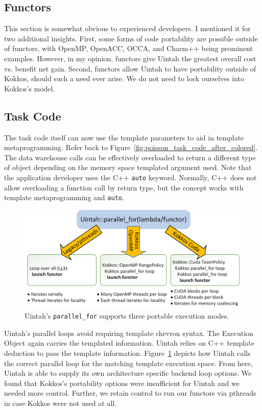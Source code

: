 \documentclass[]{article}
\begin{document}
\subsection{Functors}

This section is somewhat obvious to experienced developers.  I mentioned it for two additional insights.  First, some forms of code portability are possible outside of functors, with OpenMP, OpenACC, OCCA, and Charm++ being prominent examples.  However, in my opinion, functors give Uintah the greatest overall cost vs. benefit net gain.  Second, functors allow Uintah to have portability outside of Kokkos, should such a need ever arise.  We do not need to lock ourselves into Kokkos's model.    

\subsection{Task Code}

The task code itself can now use the template parameters to aid in template metaprogramming.  Refer back to Figure~\ref{fig:poisson_task_code_after_colored}.  The data warehouse calls can be effectively overloaded to return a different type of object depending on the memory space templated argument used.  Note that the application developer uses the C++ \texttt{auto} keyword.  Normally, C++ does not allow overloading a function call by return type, but the concept works with template metaprogramming and \texttt{auto}.  

\begin{figure}[h]
	\centerline{
		\includegraphics[width=1.0\textwidth,draft=false]{figures/uintah_parallel_for.png}
	}
	\caption{Uintah's \texttt{parallel\_for} supports three portable execution modes.} 
	\label{fig:uintah_parallel_for}
\end{figure}

Uintah's parallel loops avoid requiring template chevron syntax.  The Execution Object again carries the templated information.  Uintah relies on C++ template deduction to pass the template information.  Figure~\ref{fig:uintah_parallel_for} depicts how Uintah calls the correct parallel loop for the matching template execution space.  From here, Uintah is able to supply its own architecture specific backend loop options.  We found that Kokkos's portability options were insufficient for Uintah and we needed more control.  Further, we retain control to run our functors via pthreads in case Kokkos were not used at all.  
\end{document}
